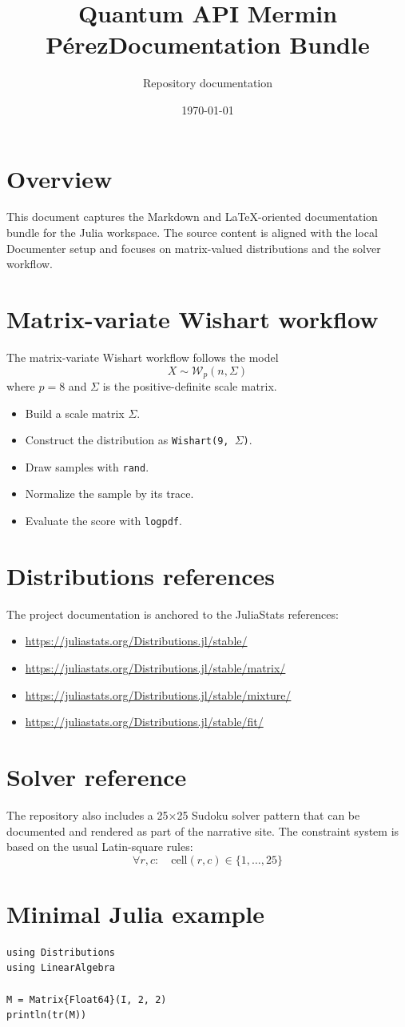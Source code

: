 \documentclass[11pt]{article}
\title{Quantum API Mermin Pérez\newline Documentation Bundle}
\author{Repository documentation}
\date{\today}
\begin{document}
\maketitle

\section{Overview}
This document captures the Markdown and LaTeX-oriented documentation bundle for the
Julia workspace. The source content is aligned with the local Documenter setup and
focuses on matrix-valued distributions and the solver workflow.

\section{Matrix-variate Wishart workflow}
The matrix-variate Wishart workflow follows the model
\[
X \sim \mathcal{W}_p(n, \Sigma)
\]
where $p = 8$ and $\Sigma$ is the positive-definite scale matrix.

\begin{itemize}[leftmargin=*]
    \item Build a scale matrix $\Sigma$.
    \item Construct the distribution as \texttt{Wishart(9, $\Sigma$)}.
    \item Draw samples with \texttt{rand}.
    \item Normalize the sample by its trace.
    \item Evaluate the score with \texttt{logpdf}.
\end{itemize}

\section{Distributions references}
The project documentation is anchored to the JuliaStats references:
\begin{itemize}[leftmargin=*]
    \item \url{https://juliastats.org/Distributions.jl/stable/}
    \item \url{https://juliastats.org/Distributions.jl/stable/matrix/}
    \item \url{https://juliastats.org/Distributions.jl/stable/mixture/}
    \item \url{https://juliastats.org/Distributions.jl/stable/fit/}
\end{itemize}

\section{Solver reference}
The repository also includes a 25×25 Sudoku solver pattern that can be documented
and rendered as part of the narrative site. The constraint system is based on the
usual Latin-square rules:
\[
\forall r,c:\quad \text{cell}(r,c) \in \{1, \dots, 25\}
\]

\section{Minimal Julia example}
\begin{lstlisting}[basicstyle=\ttfamily\small]
using Distributions
using LinearAlgebra

M = Matrix{Float64}(I, 2, 2)
println(tr(M))
\end{lstlisting}
\end{document}
